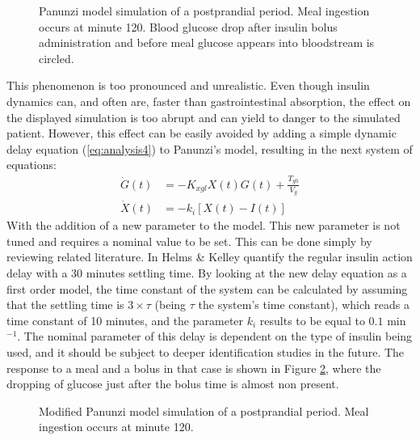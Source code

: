 \begin{figure}[hbtp]
\centering
{}\caption{Panunzi model simulation of a postprandial period. Meal ingestion occurs at minute 120. Blood glucose drop after insulin bolus administration and before meal glucose appears into bloodstream is circled.}
\label{fig:compare3}
\end{figure}

This phenomenon is too pronounced and unrealistic. Even though insulin dynamics can, and often are, faster than gastrointestinal absorption, the effect on the displayed simulation is too abrupt and can yield to danger to the simulated patient. However, this effect can be easily avoided by adding a simple dynamic delay equation (\eqref{eq:analysis4}) to Panunzi's model, resulting in the next system of equations:
\begin{align}
  \dot{G}(t) &= -K_{xgl}X(t)G(t) +\frac{T_{gh}}{V_{g}} \label{eq:analysis3} \\
  \dot{X}(t) &= -k_{i}[X(t)-I(t)] \label{eq:analysis4}
\end{align}
With the addition of a new parameter to the model. This new parameter is not tuned and requires a nominal value to be set. This can be done simply by reviewing related literature. In \cite{helms2009insulin} Helms \& Kelley quantify the regular insulin action delay with a 30 minutes settling time. By looking at the new delay equation as a first order model, the time constant of the system can be calculated by assuming that the settling time is $3\times \tau$ (being $\tau$ the system's time constant), which reads a time constant of 10 minutes, and the parameter $k_{i}$ results to be equal to $0.1$ min$^{-1}$. The nominal parameter of this delay is dependent on the type of insulin being used, and it should be subject to deeper identification studies in the future. The response to a meal and a bolus in that case is shown in Figure \ref{fig:compare4}, where the dropping of glucose just after the bolus time is almost non present.

\begin{figure}[hbtp]
\centering
{}\caption{Modified Panunzi model simulation of a postprandial period. Meal ingestion occurs at minute 120.}
\label{fig:compare4}
\end{figure}

